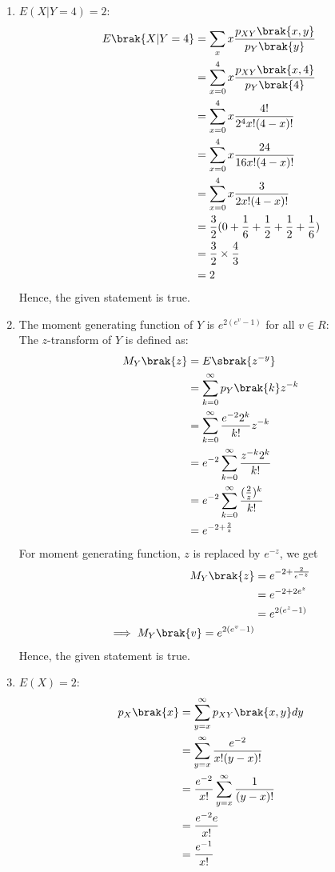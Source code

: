 \documentclass[journal,12pt,twocolumn]{IEEEtran}
\theoremstyle{remark}
\begin{document}
\begin{enumerate}
\item ${E(X|Y = 4) = 2}$:
\begin{align}
E\brak{X|Y=4} &= \sum_{x} x\frac{p_{XY}\brak{x,y}}{p_Y\brak{y}}\\
&= \sum_{x=0}^{4} x\frac{p_{XY}\brak{x,4}}{p_Y\brak{4}}\\
&= \sum_{x=0}^{4} x\frac{4!}{2^4 x!(4-x)!}\\
&= \sum_{x=0}^{4} x\frac{24}{16 x!(4-x)!}\\
&= \sum_{x=0}^{4} x\frac{3}{2 x!(4-x)!}\\
&= \frac{3}{2}(0 + \frac{1}{6} + \frac{1}{2} + \frac{1}{2} + \frac{1}{6})\\
&= \frac{3}{2}\times \frac{4}{3}\\
&= 2
\end{align}
Hence, the given statement is true.
\item The moment generating function of $Y$ is $e^{2(e^v - 1)}$ for all $v \in R$:\\
The $z$-transform of $Y$ is defined as:
\begin{align}
M_Y\brak{z} &= E\sbrak{z^{-y}}\\
&= \sum_{k=0}^{\infty} p_Y\brak{k}z^{-k}\\
&= \sum_{k=0}^{\infty} \frac{e^{-2}2^k}{k!}z^{-k}\\
&= e^{-2} \sum_{k=0}^{\infty} \frac{z^{-k}2^k}{k!}\\
&= e^{-2} \sum_{k=0}^{\infty} \frac{(\frac{2}{z})^k}{k!}\\
&= e^{-2+\frac{2}{z}}
\end{align}
For moment generating function, $z$ is replaced by $e^{-z}$, we get
\begin{align}
M_Y\brak{z} &= e^{-2+\frac{2}{e^{-z}}}\\
&= e^{-2+2e^z}\\
&= e^{2(e^z-1)}\\
\implies M_Y\brak{v} = e^{2(e^v-1)} 
\end{align}
Hence, the given statement is true.
\item ${E(X) = 2}$:
\begin{align}
p_X\brak{x} &= \sum_{y=x}^{\infty}p_{XY}\brak{x,y}dy\\
&= \sum_{y=x}^{\infty} \frac{e^{-2}}{x!(y - x)!}\\
&= \frac{e^{-2}}{x!}\sum_{y=x}^{\infty}\frac{1}{(y - x)!}\\
&= \frac{e^{-2}e}{x!}\\
&= \frac{e^{-1}}{x!}

\end{align}
\end{enumerate}
\end{document}

